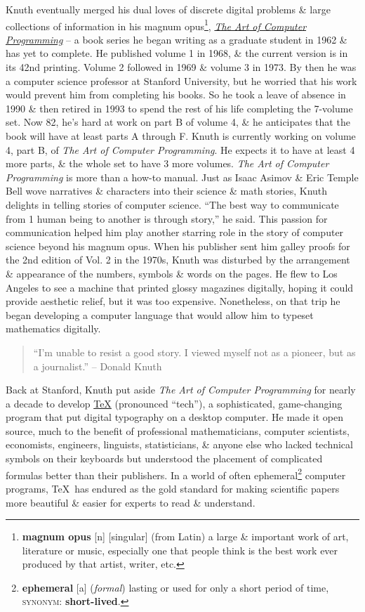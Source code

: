 \documentclass[oneside]{book}
\numberwithin{equation}{section}
\begin{document}
Knuth eventually merged his dual loves of discrete digital problems \& large collections of information in his magnum opus\footnote{\textbf{magnum opus} [n] [singular] (from Latin) a large \& important work of art, literature or music, especially one that people think is the best work ever produced by that artist, writer, etc.}, \href{https://www-cs-faculty.stanford.edu/~knuth/taocp.html}{\textit{The Art of Computer Programming}} -- a book series he began writing as a graduate student in 1962 \& has yet to complete. He published volume 1 in 1968, \& the current version is in its 42nd printing. Volume 2 followed in 1969 \& volume 3 in 1973. By then he was a computer science professor at Stanford University, but he worried that his work would prevent him from completing his books. So he took a leave of absence in 1990 \& then retired in 1993 to spend the rest of his life completing the 7-volume set. Now 82, he's hard at work on part B of volume 4, \& he anticipates that the book will have at least parts A through F. \textsf{Knuth is currently working on volume 4, part B, of \textit{The Art of Computer Programming}. He expects it to have at least 4 more parts, \& the whole set to have 3 more volumes.} \textit{The Art of Computer Programming} is more than a how-to manual. Just as Isaac Asimov \& Eric Temple Bell wove narratives \& characters into their science \& math stories, Knuth delights in telling stories of computer science. ``The best way to communicate from 1 human being to another is through story,'' he said. This passion for communication helped him play another starring role in the story of computer science beyond his magnum opus. When his publisher sent him galley proofs for the 2nd edition of Vol. 2 in the 1970s, Knuth was disturbed by the arrangement \& appearance of the numbers, symbols \& words on the pages. He flew to Los Angeles to see a machine that printed glossy magazines digitally, hoping it could provide aesthetic relief, but it was too expensive. Nonetheless, on that trip he began developing a computer language that would allow him to typeset mathematics digitally.
\begin{quotation}
	``I'm unable to resist a good story. I viewed myself not as a pioneer, but as a journalist.'' -- Donald Knuth
\end{quotation}
Back at Stanford, Knuth put aside \textit{The Art of Computer Programming} for nearly a decade to develop \href{https://www.tug.org/whatis.html}{\TeX} (pronounced ``tech''), a sophisticated, game-changing program that put digital typography on a desktop computer. He made it open source, much to the benefit of professional mathematicians, computer scientists, economists, engineers, linguists, statisticians, \& anyone else who lacked technical symbols on their keyboards but understood the placement of complicated formulas better than their publishers. In a world of often ephemeral\footnote{\textbf{ephemeral} [a] (\textit{formal}) lasting or used for only a short period of time, \textsc{synonym}: \textbf{short-lived}.} computer programs, \TeX\ has endured as the gold standard for making scientific papers more beautiful \& easier for experts to read \& understand.
\end{document}
